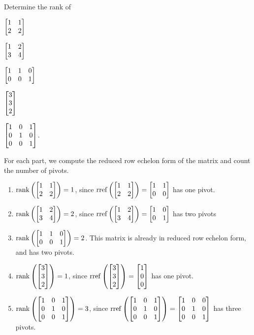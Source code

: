 	\begin{parts}
		\item Determine the rank of
		\begin{enumerate*}
			\item $\mat{1&1\\2&2}$
			\item $\mat{1&2\\3&4}$
			\item $\mat{1&1&0\\0&0&1}$
			\item $\mat{3\\3\\2}$
			\item $\mat{1&0&1\\0&1&0\\0&0&1}$.
		\end{enumerate*}
		\begin{solution}
			For each part, we compute the reduced row echelon form of the matrix
			and count the number of pivots.
			\begin{enumerate}
				\item $\Rank\left(\mat{1&1\\2&2}\right)=1$, since
					$\rref\left(\mat{1&1\\2&2}\right)=\mat{1&1\\0&0}$ has one pivot.
				\item $\Rank\left(\mat{1&2\\3&4}\right)=2$, since
					$\rref\left(\mat{1&2\\3&4}\right)=\mat{1&0\\0&1}$ has two pivots
				\item $\Rank\left(\mat{1&1&0\\0&0&1}\right)=2$.
					This matrix is already in reduced row echelon form, and has two pivots.
				\item $\Rank\left(\mat{3\\3\\2}\right)=1$, since
					$\rref\left(\mat{3\\3\\2}\right)=\mat{1\\0\\0}$ has one pivot.
				\item $\Rank\left(\mat{1&0&1\\0&1&0\\0&0&1}\right)=3$, since
					$\rref\left(\mat{1&0&1\\0&1&0\\0&0&1}\right)=\mat{1&0&0\\0&1&0\\0&0&1}$
					has three pivots.
			\end{enumerate}
		\end{solution}
	\end{parts}


